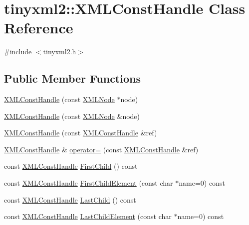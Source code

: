 \hypertarget{classtinyxml2_1_1_x_m_l_const_handle}{}\section{tinyxml2\+:\+:X\+M\+L\+Const\+Handle Class Reference}
\label{classtinyxml2_1_1_x_m_l_const_handle}


{\ttfamily \#include $<$tinyxml2.\+h$>$}

\subsection*{Public Member Functions}
\begin{DoxyCompactItemize}
\item 
\hyperlink{classtinyxml2_1_1_x_m_l_const_handle_a098bda71fa11d7c74ccddab59d5dd534}{X\+M\+L\+Const\+Handle} (const \hyperlink{classtinyxml2_1_1_x_m_l_node}{X\+M\+L\+Node} $\ast$node)
\item 
\hyperlink{classtinyxml2_1_1_x_m_l_const_handle_a8420a0c4720637e0529e78c2e22f2b0b}{X\+M\+L\+Const\+Handle} (const \hyperlink{classtinyxml2_1_1_x_m_l_node}{X\+M\+L\+Node} \&node)
\item 
\hyperlink{classtinyxml2_1_1_x_m_l_const_handle_a639317ad315ff24f4ef0dc69312d7303}{X\+M\+L\+Const\+Handle} (const \hyperlink{classtinyxml2_1_1_x_m_l_const_handle}{X\+M\+L\+Const\+Handle} \&ref)
\item 
\hyperlink{classtinyxml2_1_1_x_m_l_const_handle}{X\+M\+L\+Const\+Handle} \& \hyperlink{classtinyxml2_1_1_x_m_l_const_handle_a2d74c91df1ff9aa5f9b57e3dceddbf94}{operator=} (const \hyperlink{classtinyxml2_1_1_x_m_l_const_handle}{X\+M\+L\+Const\+Handle} \&ref)
\item 
const \hyperlink{classtinyxml2_1_1_x_m_l_const_handle}{X\+M\+L\+Const\+Handle} \hyperlink{classtinyxml2_1_1_x_m_l_const_handle_aef06bd16cb308652a32b864b0a743136}{First\+Child} () const
\item 
const \hyperlink{classtinyxml2_1_1_x_m_l_const_handle}{X\+M\+L\+Const\+Handle} \hyperlink{classtinyxml2_1_1_x_m_l_const_handle_ac747db472ffc55c5af2e82ffec813640}{First\+Child\+Element} (const char $\ast$name=0) const
\item 
const \hyperlink{classtinyxml2_1_1_x_m_l_const_handle}{X\+M\+L\+Const\+Handle} \hyperlink{classtinyxml2_1_1_x_m_l_const_handle_a908436124990f3d7b35cb7df20d31d9e}{Last\+Child} () const
\item 
const \hyperlink{classtinyxml2_1_1_x_m_l_const_handle}{X\+M\+L\+Const\+Handle} \hyperlink{classtinyxml2_1_1_x_m_l_const_handle_a9de0475ec42bd50c0e64624a250ba5b2}{Last\+Child\+Element} (const char $\ast$name=0) const

\end{DoxyCompactItemize}
